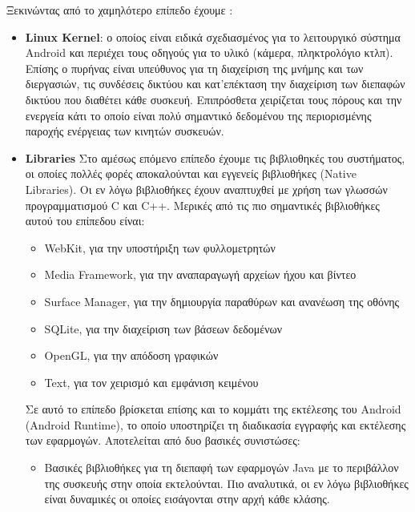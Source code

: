 		 Ξεκινώντας από το χαμηλότερο επίπεδο έχουμε \cite{collinsAndroid}\cite{annuzziAndroid}\cite{androidArchAnalysis}:
		 \begin{itemize}
		 	\item \textbf{Linux Kernel}: ο οποίος είναι ειδικά σχεδιασμένος για το λειτουργικό σύστημα Android και περιέχει τους οδηγούς για το υλικό (κάμερα, πληκτρολόγιο κτλπ). Επίσης ο πυρήνας είναι υπεύθυνος για τη διαχείριση της μνήμης και των διεργασιών, τις συνδέσεις δικτύου και κατ'επέκταση την διαχείριση των διεπαφών δικτύου που διαθέτει κάθε συσκευή. Επιπρόσθετα χειρίζεται τους πόρους και την ενεργεία κάτι το οποίο είναι πολύ σημαντικό δεδομένου της περιορισμένης παροχής ενέργειας των κινητών συσκευών. 
		 	\item \textbf{Libraries} Στο αμέσως επόμενο επίπεδο έχουμε τις βιβλιοθηκές του συστήματος, οι οποίες πολλές φορές αποκαλούνται και εγγενείς βιβλιοθήκες (Native Libraries). Οι εν λόγω βιβλιοθήκες έχουν αναπτυχθεί με χρήση των γλωσσών προγραμματισμού C και C++. Μερικές από τις πιο σημαντικές βιβλιοθήκες αυτού του επίπεδου είναι:
		 	\begin{itemize}
		 		\item WebKit, για την υποστήριξη των φυλλομετρητών
		 		\item Media Framework, για την αναπαραγωγή αρχείων ήχου και βίντεο
		 		\item Surface Manager, για την δημιουργία παραθύρων και ανανέωση της οθόνης
		 		\item SQLite, για την διαχείριση των βάσεων δεδομένων
		 		\item OpenGL, για την απόδοση γραφικών
		 		\item Text, για τον χειρισμό και εμφάνιση κειμένου
		 	\end{itemize}
		 	Σε αυτό το επίπεδο βρίσκεται επίσης και το κομμάτι της εκτέλεσης του Android (Android Runtime), το οποίο υποστηρίζει τη διαδικασία εγγραφής και εκτέλεσης των εφαρμογών. Αποτελείται από δυο βασικές συνιστώσες:
		 	\begin{itemize}
		 		\item Βασικές βιβλιοθήκες για τη διεπαφή των εφαρμογών Java με το περιβάλλον της συσκευής στην οποία εκτελούνται. Πιο αναλυτικά, οι εν λόγω βιβλιοθήκες είναι δυναμικές οι οποίες εισάγονται στην αρχή κάθε κλάσης.

\end{itemize}
\end{itemize}
